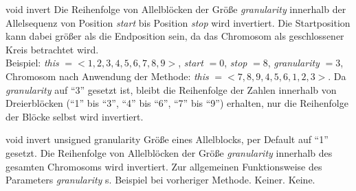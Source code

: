 \documentclass{report}
\begin{document}
    \setCorrectWidthThree{8pt}
    \printMethodWithParamsSaved
        {void}
        {}
        {invert}
        {Die Reihenfolge von Allelbl\"ocken der Gr\"o{\ss}e {\em granularity}
         innerhalb der Allelsequenz von Position {\em start} bis Position 
         {\em stop} wird invertiert. Die Startposition kann dabei 
         gr\"o{\ss}er als die Endposition sein, da das Chromosom als  
         geschlossener Kreis betrachtet wird.\\
         Beispiel: {\em this} $= < 1, 2, 3, 4, 5, 6, 7, 8, 9 >$,
         {\em start} $= 0$, {\em stop} $= 8$, {\em granularity} $= 3$,
         Chromosom nach Anwendung der Methode: {\em this} 
         $= < 7, 8, 9, 4, 5, 6, 1, 2, 3 >$. Da {\em granularity} auf
         ``3'' gesetzt ist, bleibt die Reihenfolge der Zahlen
         innerhalb von Dreierbl\"ocken (``1'' bis ``3'', ``4'' bis ``6'',
         ``7'' bis ``9'') erhalten, nur die Reihenfolge der Bl\"ocke
         selbst wird invertiert.}
        {}
    \setCorrectWidthThree{4pt}

\vspace{4ex}

    \printMethodWithOneParam
    {void} 
    {invert}
    {unsigned} 
    {granularity}
    {Gr\"o{\ss}e eines Allelblocks, per Default auf ``1'' gesetzt.}
    {Die Reihenfolge von Allelbl\"ocken der Gr\"o{\ss}e {\em granularity} 
     innerhalb des gesamten Chromosoms wird invertiert. Zur allgemeinen
     Funktionsweise des Parameters {\em granularity} s. Beispiel bei
     vorheriger Methode.}
    {Keiner.}
    {Keine.}
\end{document}
